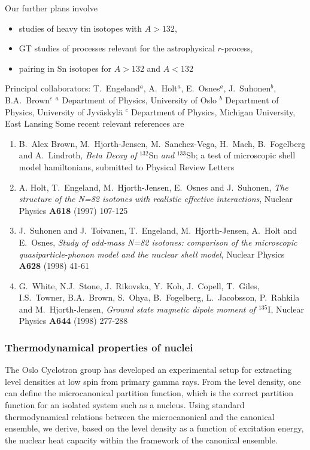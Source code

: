 Our further plans involve
\begin{itemize}
\item studies of heavy tin isotopes with $A > 132$,
\item GT studies of processes relevant for the 
      astrophysical $r$-process,
\item pairing in Sn isotopes for $A > 132$ and $A < 132$
\end{itemize}
Principal collaborators: T.\ Engeland$^a$, 
A.\ Holt$^a$, E.\ Osnes$^a$, 
J.\ Suhonen$^b$,  
B.A.\ Brown$^c$\newline
${}^a$ Department of Physics,
University of Oslo\newline
${}^b$ Department of Physics,
University of Jyv\"{a}skyl\"{a}\newline
${}^c$ Department of Physics, Michigan University, East Lansing\newline 
\newline\newline
Some recent relevant references are
\begin{enumerate}
\item B.~Alex Brown, M.~Hjorth-Jensen,  M.~Sanchez-Vega, H.~Mach, 
B.~Fogelberg and A.~Lindroth, 
{\em Beta Decay of }$^{132}$Sn {\em and} $^{133}$Sb; a test of microscopic shell model hamiltonians, submitted to
Physical Review Letters

\item
    A. Holt, T.\ Engeland, M.\ Hjorth-Jensen, E.\ Osnes and J.\ Suhonen,
    {\em The structure of the N=82 isotones with realistic effective
     interactions},
    Nuclear Physics {\bf A618} (1997) 107-125
\item
    J.\ Suhonen and J.\ Toivanen, 
    T.\ Engeland, M.\ Hjorth-Jensen, A.\ Holt and E.\ Osnes,
    {\em Study of odd-mass N=82 isotones: comparison of the microscopic
    quasiparticle-phonon model and the nuclear shell model},
    Nuclear Physics {\bf A628} (1998) 41-61
\item 
    G.\ White, N.J.\ Stone, J.\ Rikovska, Y.\ Koh, J.\ Copell,
    T.\ Giles, I.S.\ Towner, B.A.\ Brown, S.\ Ohya, B.\ Fogelberg,
    L.\ Jacobsson, P.\ Rahkila and M.\ Hjorth-Jensen,
    {\em Ground state magnetic dipole moment of $^{135}$}I,
    Nuclear Physics {\bf A644} (1998) 277-288

\end{enumerate}





\subsubsection{Thermodynamical properties of nuclei}
The Oslo Cyclotron group has developed an experimental 
setup for extracting level densities 
at low spin from primary gamma rays.
From the level density, one can define the microcanonical
partition function, which is the correct partition function
for an isolated system such as a nucleus.
Using standard thermodynamical relations between the microcanonical
and the canonical ensemble, we derive, based on the 
level density as a function of excitation energy,  
the nuclear heat
capacity within the framework of the canonical ensemble. 

